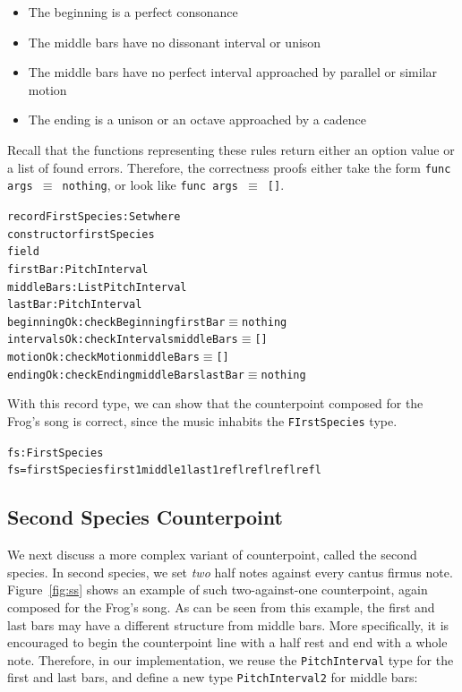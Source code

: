 \begin{itemize}
  \item The beginning is a perfect consonance
  \item The middle bars have no dissonant interval or unison
  \item The middle bars have no perfect interval approached by
    parallel or similar motion
  \item The ending is a unison or an octave approached by a cadence
\end{itemize}

\noindent Recall that the functions representing these rules return
either an option value or a list of found errors.
Therefore, the correctness proofs either take the form
\texttt{func args $\equiv$ nothing}, or look like
\texttt{func args $\equiv$ []}.

\begin{alltt}
record FirstSpecies : Set where
  constructor firstSpecies
  field
    firstBar    : PitchInterval
    middleBars  : List PitchInterval
    lastBar     : PitchInterval
    beginningOk : checkBeginning firstBar \(\equiv\) nothing
    intervalsOk : checkIntervals middleBars \(\equiv\) []
    motionOk    : checkMotion middleBars \(\equiv\) []
    endingOk    : checkEnding middleBars lastBar \(\equiv\) nothing
\end{alltt}

With this record type, we can show that the counterpoint composed
for the Frog's song is correct, since the music inhabits the
\texttt{FIrstSpecies} type.

\begin{alltt}
fs : FirstSpecies
fs = firstSpecies first1 middle1 last1 refl refl refl refl
\end{alltt}

\subsection{Second Species Counterpoint}
\label{sec:cp:ss}

\SS

We next discuss a more complex variant of counterpoint, called the
second species.
In second species, we set \emph{two} half notes against every cantus
firmus note.
Figure~\ref{fig:ss} shows an example of such two-against-one
counterpoint, again composed for the Frog's song.
As can be seen from this example, the first and last bars may have
a different structure from middle bars.
More specifically, it is encouraged to begin the counterpoint line with
a half rest and end with a whole note.
Therefore, in our implementation, we reuse the \texttt{PitchInterval} 
type for the first and last bars, and define a new type
\texttt{PitchInterval2} for middle bars:

